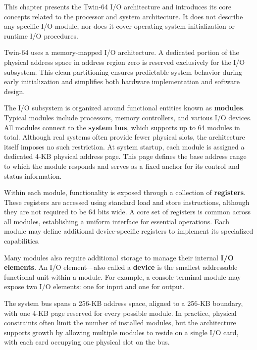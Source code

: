 
This chapter presents the Twin-64 I/O architecture and introduces its core concepts related to the processor and system architecture. It does not describe any specific I/O module, nor does it cover operating-system initialization or runtime I/O procedures.


Twin-64 uses a memory-mapped I/O architecture. A dedicated portion of the physical address space in address region zero is reserved exclusively for the I/O subsystem. This clean partitioning ensures predictable system behavior during early initialization and simplifies both hardware implementation and software design.

The I/O subsystem is organized around functional entities known as \textbf{modules}. Typical modules include processors, memory controllers, and various I/O devices. All modules connect to the \textbf{system bus}, which supports up to 64 modules in total. Although real systems often provide fewer physical slots, the architecture itself imposes no such restriction. At system startup, each module is assigned a dedicated 4-KB physical address page. This page defines the base address range to which the module responds and serves as a fixed anchor for its control and status information.

Within each module, functionality is exposed through a collection of \textbf{registers}. These registers are accessed using standard load and store instructions, although they are not required to be 64 bits wide. A core set of registers is common across all modules, establishing a uniform interface for essential operations. Each module may define additional device-specific registers to implement its specialized capabilities. 

Many modules also require additional storage to manage their internal \textbf{I/O elements}. An I/O element—also called a \textbf{device} is the smallest addressable functional unit within a module. For example, a console terminal module may expose two I/O elements: one for input and one for output.

The system bus spans a 256-KB address space, aligned to a 256-KB boundary, with one 4-KB page reserved for every possible module. In practice, physical constraints often limit the number of installed modules, but the architecture supports growth by allowing multiple modules to reside on a single I/O card, with each card occupying one physical slot on the bus.

